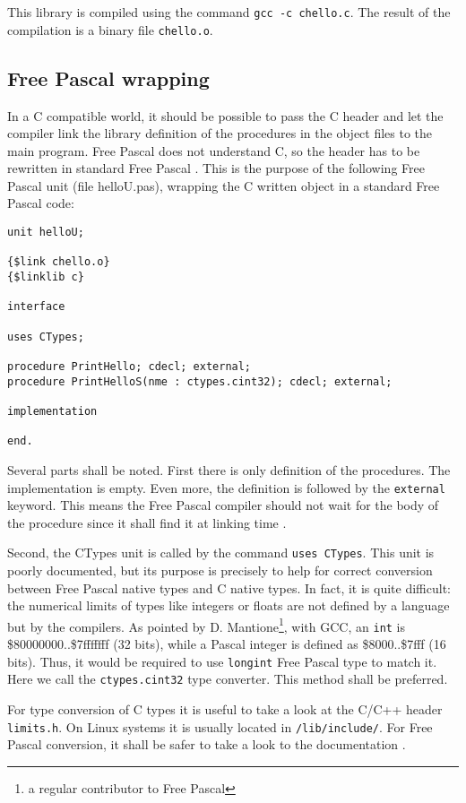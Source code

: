 \documentclass[A4paper]{article}
\begin{document}
This library is compiled using the command \verb|gcc -c chello.c|. The result
of the compilation is a binary file \verb|chello.o|.

\subsection{Free Pascal wrapping}

In a C compatible world, it should be possible to pass the C header and let
the compiler link the library definition of the procedures in the object files
to the main program. Free Pascal does not understand C, so the header has to
be rewritten in standard Free Pascal \cite{FPDoc,FPFor}. This is the purpose
of the following Free Pascal unit (file helloU.pas), wrapping the C written
object in a standard Free Pascal code:

\begin{verbatim}
unit helloU;

{$link chello.o}
{$linklib c}

interface

uses CTypes;

procedure PrintHello; cdecl; external;
procedure PrintHelloS(nme : ctypes.cint32); cdecl; external;

implementation

end.
\end{verbatim}

Several parts shall be noted. First there is only definition of the
procedures. The implementation is empty. Even more, the definition is followed
by the \verb|external| keyword. This means the Free Pascal compiler should not
wait for the body of the procedure since it shall find it at linking
time \cite{FPDoc,FPFor}.

Second, the CTypes unit is called by the command \verb|uses CTypes|. This unit
is poorly documented, but its purpose is precisely to help for correct
conversion between Free Pascal native types and C native types. In fact, it is
quite difficult: the numerical limits of types like integers or floats are not
defined by a language but by the compilers. As pointed by
D. Mantione\footnote{a regular contributor to Free Pascal}, with GCC, an
\verb|int| is \$80000000..\$7fffffff (32 bits), while a Pascal integer is
defined as \$8000..\$7fff (16 bits). Thus, it would be required to use
\verb|longint| Free Pascal type to match it. Here we call the
\verb|ctypes.cint32| type converter. This method shall be preferred.

For type conversion of C types it is useful to take a look at the
C/C++ header \verb|limits.h|. On Linux systems it is usually located in
\verb|/lib/include/|. For Free Pascal conversion, it shall be safer to take a
look to the documentation \cite{FPDoc,FPFor}.
\end{document}
